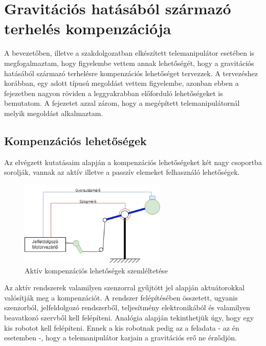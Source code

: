 \chapter{Gravitációs hatásából származó terhelés kompenzációja}
\label{sec:grav_komp}

A bevezetőben, illetve a szakdolgozatban elkészített telemanipulátor esetében is megfogalmaztam, hogy figyelembe vettem annak lehetőségét, hogy a gravitációs hatásából származó terhelésre kompenzációs lehetőséget tervezzek. A tervezéshez korábban, egy adott típusú megoldást vettem figyelembe, azonban ebben a fejezetben nagyon röviden a leggyakrabban előforduló lehetőségeket is bemutatom. A fejezetet azzal zárom, hogy a megépített telemanipulátornál melyik megoldást alkalmaztam.

\section{Kompenzációs lehetőségek}

Az elvégzett kutatásaim alapján a kompenzációs lehetőségeket két nagy csoportba sorolják, vannak az aktív illetve a passzív elemeket felhasználó lehetőségek.

\begin{figure}[!h]
\centering
\includegraphics[width=70mm, keepaspectratio]{figures/Diagrammok/Kompenzacios_lehetosegek_aktiv}
\caption{Aktív kompenzációs lehetőségek szemléltetése}
\label{fig:Kompenzacios_lehetosegek_aktív}
\end{figure}

Az aktív rendszerek valamilyen szenzorral gyűjtött jel alapján aktuátorokkal valósítják meg a kompenzációt. A rendszer felépítésében összetett, ugyanis szenzorból, jelfeldolgozó rendszerből, teljesítmény elektronikából és valamilyen beavatkozó szervből kell felépíteni. Analógia alapján tekinthetjük úgy, hogy egy kis robotot kell felépíteni. Ennek a kis robotnak pedig az a feladata - az én esetemben -, hogy a telemanipulátor karjain a gravitációs erő ne érződjön.


